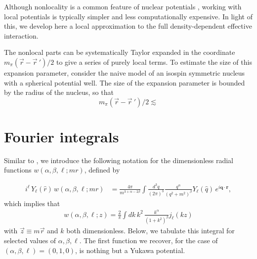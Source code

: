 \documentclass[%
 preprint,
 amsmath,amssymb,
 aps,
]{revtex4-1}
\begin{document}
Although nonlocality is a common feature of nuclear potentials \cite{PhysRevC.53.R1483}, working with local potentials is typically simpler and less computationally expensive. In light of this, we develop here a local approximation to the full density-dependent effective interaction.

The nonlocal parts can be systematically Taylor expanded in the coordinate $m_\pi(\vec{r}-\vec{r}\:')/2$ to give a series of purely local terms. To estimate the size of this expansion parameter, consider the naive model of an isospin symmetric nucleus with a spherical potential well. The size of the expansion parameter is bounded by the radius of the nucleus, so that 
\begin{equation}
m_\pi(\vec{r}-\vec{r}\:')/2 \lesssim 
\end{equation}

\appendix

\section{\label{app:wNotation}Fourier integrals}

Similar to \cite{PhysRevC.85.024003}, we introduce the following notation for the dimensionless radial functions $w(\alpha,\beta,\ell; m r)$, defined by

\begin{align}
i^\ell \, Y_\ell(\hat{r}) \, w(\alpha,\beta,\ell; m r)  &= \frac{4 \pi}{m^{3+\alpha-2\beta} }  \int \frac{d^3 q}{(2\pi)^3} \frac{q^\alpha}{(q^2+m^2)^\beta} Y_\ell(\hat{q}) \, e^{i \mathbf{q} \cdot \mathbf{r}  },
\end{align}
which implies that
\begin{align}\label{eq:wDef}
w(\alpha,\beta,\ell; z) =  \frac{2}{\pi} \int dk \, k^2 \, \frac{k^\alpha}{(1+k^2)^\beta} j_\ell(k z)
\end{align}
with $\vec{z} \equiv m \vec{r}$ and $k$ both dimensionless. Below, we tabulate this integral for selected values of $\alpha, \beta, \ell$. The first function we recover, for the case of $(\alpha, \beta, \ell ) = (0,1,0)$, is nothing but a Yukawa potential. 
\end{document}
